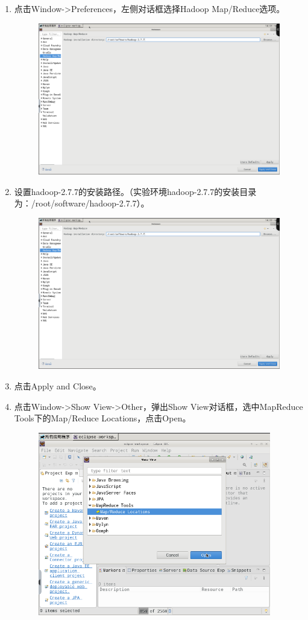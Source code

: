 \documentclass {article}
\begin{document}
\begin{enumerate}
					\item 点击Window->Preferences，左侧对话框选择Hadoop Map/Reduce选项。
					\begin{figure}[H]
						\centering
						\includegraphics[width=4.5in]{figures/fig4.png}
					\end{figure}
				
					\item 设置hadoop-2.7.7的安装路径。（实验环境hadoop-2.7.7的安装目录为：/root/software/hadoop-2.7.7）。
					\begin{figure}[H]
						\centering
						\includegraphics[width=4.5in]{figures/fig4.png}
					\end{figure}
				
					\item 点击Apply and Close。
					\item 点击Window->Show View->Other，弹出Show View对话框，选中MapReduce Tools下的Map/Reduce Locations，点击Open。
					\begin{figure}[H]
						\centering
						\includegraphics[width=4in]{figures/fig5.png}
					\end{figure}
				

\end{enumerate}
\end{document}

